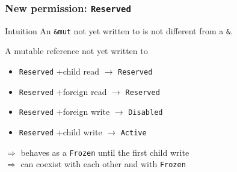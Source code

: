 \begin{frame}
    \frametitle{New permission: \texttt{Reserved}}
    \begin{exampleblock}{Intuition}
        An \texttt{\&mut} not yet written to is not different from a \texttt{\&}.
    \end{exampleblock}

    A mutable reference not yet written to
    \begin{itemize}
        \item \texttt{Reserved} +child read \(\to\) \texttt{Reserved}
        \item \texttt{Reserved} +foreign read \(\to\) \texttt{Reserved}
        \item \texttt{Reserved} +foreign write \(\to\) \texttt{Disabled}
        \item \texttt{Reserved} +child write \(\to\) \texttt{Active}
    \end{itemize}
    \(\Rightarrow\) behaves as a \texttt{Frozen} until the first child write\\
    \(\Rightarrow\) can coexist with each other and with \texttt{Frozen}~\\~\\
\end{frame}

